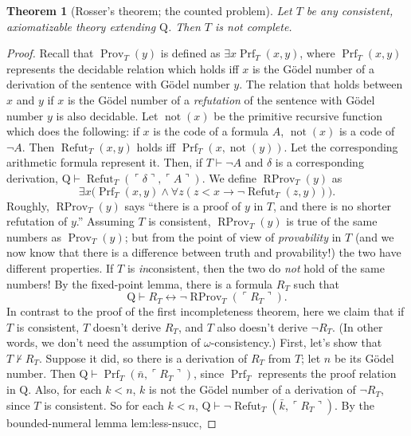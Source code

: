 \documentclass[UTF8,11pt]{ctexart}
\newtheorem*{theorem}{Theorem}
\theoremstyle{definition}
\begin{document}
\begin{theorem}[Rosser's theorem; the counted problem]
Let $T$ be any consistent, axiomatizable theory extending $\mathrm Q$. Then $T$ is not complete.
\end{theorem}
\begin{proof}
Recall that $\operatorname{Prov}_T(y)$ is defined as $\exists x\operatorname{Prf}_T(x,y)$, where $\operatorname{Prf}_T(x,y)$ represents the decidable relation which holds iff $x$ is the G\"odel number of a derivation of the sentence with G\"odel number $y$. The relation that holds between $x$ and $y$ if $x$ is the G\"odel number of a \emph{refutation} of the sentence with G\"odel number $y$ is also decidable. Let $\operatorname{not}(x)$ be the primitive recursive function which does the following: if $x$ is the code of a formula $A$, $\operatorname{not}(x)$ is a code of $\neg A$. Then $\operatorname{Refut}_T(x,y)$ holds iff $\operatorname{Prf}_T(x,\operatorname{not}(y))$. Let the corresponding arithmetic formula represent it. Then, if $T\vdash\neg A$ and $\delta$ is a corresponding derivation, $\mathrm Q\vdash\operatorname{Refut}_T(\ulcorner\delta\urcorner,\ulcorner A\urcorner)$. We define $\operatorname{RProv}_T(y)$ as
\[\exists x\bigl(\operatorname{Prf}_T(x,y)\land\forall z(z<x\to\neg\operatorname{Refut}_T(z,y))\bigr).\]
Roughly, $\operatorname{RProv}_T(y)$ says ``there is a proof of $y$ in $T$, and there is no shorter refutation of $y$.'' Assuming $T$ is consistent, $\operatorname{RProv}_T(y)$ is true of the same numbers as $\operatorname{Prov}_T(y)$; but from the point of view of \emph{provability} in $T$ (and we now know that there is a difference between truth and provability!) the two have different properties. If $T$ is \emph{in}consistent, then the two do \emph{not} hold of the same numbers!
By the fixed-point lemma, there is a formula $R_T$ such that
\begin{equation}\mathrm Q\vdash R_T\leftrightarrow\neg\operatorname{RProv}_T(\ulcorner R_T\urcorner).\label{RT}\end{equation}
In contrast to the proof of the first incompleteness theorem, here we claim that if $T$ is consistent, $T$ doesn't derive $R_T$, and $T$ also doesn't derive $\neg R_T$. (In other words, we don't need the assumption of $\omega$-consistency.)
First, let's show that $T\nvdash R_T$. Suppose it did, so there is a derivation of $R_T$ from $T$; let $n$ be its G\"odel number. Then $\mathrm Q\vdash\operatorname{Prf}_T(\bar n,\ulcorner R_T\urcorner)$, since $\operatorname{Prf}_T$ represents the proof relation in $\mathrm Q$. Also, for each $k<n$, $k$ is not the G\"odel number of a derivation of $\neg R_T$, since $T$ is consistent. So for each $k<n$, $\mathrm Q\vdash\neg\operatorname{Refut}_T(\bar k,\ulcorner R_T\urcorner)$. By the bounded-numeral lemma \textsf{lem:less-nsucc},

\end{proof}
\end{document}
